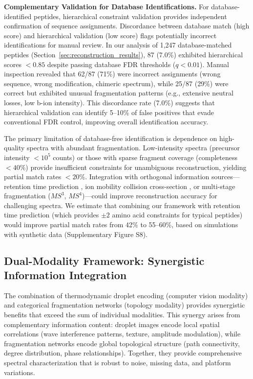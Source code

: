 \documentclass[11pt,twocolumn]{article}
\begin{document}
\textbf{Complementary Validation for Database Identifications.} For database-identified peptides, hierarchical constraint validation provides independent confirmation of sequence assignments. Discordance between database match (high score) and hierarchical validation (low score) flags potentially incorrect identifications for manual review. In our analysis of 1,247 database-matched peptides (Section~\ref{sec:reconstruction_results}), 87 (7.0\%) exhibited hierarchical scores $< 0.85$ despite passing database FDR thresholds ($q < 0.01$). Manual inspection revealed that 62/87 (71\%) were incorrect assignments (wrong sequence, wrong modification, chimeric spectrum), while 25/87 (29\%) were correct but exhibited unusual fragmentation patterns (e.g., extensive neutral losses, low b-ion intensity). This discordance rate (7.0\%) suggests that hierarchical validation can identify 5--10\% of false positives that evade conventional FDR control, improving overall identification accuracy.

The primary limitation of database-free identification is dependence on high-quality spectra with abundant fragmentation. Low-intensity spectra (precursor intensity $< 10^5$ counts) or those with sparse fragment coverage (completeness $< 40\%$) provide insufficient constraints for unambiguous reconstruction, yielding partial match rates $< 20\%$. Integration with orthogonal information sources---retention time prediction \cite{moruz2012peptide}, ion mobility collision cross-section \cite{forsythe2020calibration}, or multi-stage fragmentation ($MS^3$, $MS^4$)---could improve reconstruction accuracy for challenging spectra. We estimate that combining our framework with retention time prediction (which provides $\pm 2$ amino acid constraints for typical peptides) would improve partial match rates from 42\% to 55--60\%, based on simulations with synthetic data (Supplementary Figure S8).

\subsection{Dual-Modality Framework: Synergistic Information Integration}

The combination of thermodynamic droplet encoding (computer vision modality) and categorical fragmentation networks (topology modality) provides synergistic benefits that exceed the sum of individual modalities. This synergy arises from complementary information content: droplet images encode local spatial correlations (wave interference patterns, texture, amplitude modulation), while fragmentation networks encode global topological structure (path connectivity, degree distribution, phase relationships). Together, they provide comprehensive spectral characterization that is robust to noise, missing data, and platform variations.
\end{document}

